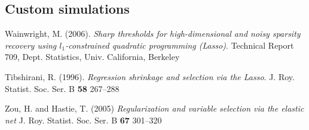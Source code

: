 \documentclass[letterpaper,12pt]{article}
\begin{document}
\subsection*{Custom simulations}

\begin{thebibliography}{9}
  Wainwright, M. (2006).
  \textit{Sharp thresholds for high-dimensional and noisy sparsity
    recovery using $l_1$-constrained quadratic programming (Lasso)}.
  Technical Report 709, Dept. Statistics, Univ. California,
  Berkeley

  Tibshirani, R. (1996).
  \textit{Regression shrinkage and selection via the Lasso}.
  J. Roy. Statist. Soc. Ser. B \textbf{58} 267--288

  Zou, H. and Hastie, T. (2005)
  \textit{Regularization and variable selection via the elastic net}
  J. Roy. Statist. Soc. Ser. B \textbf{67} 301--320

\end{thebibliography}
\end{document}
